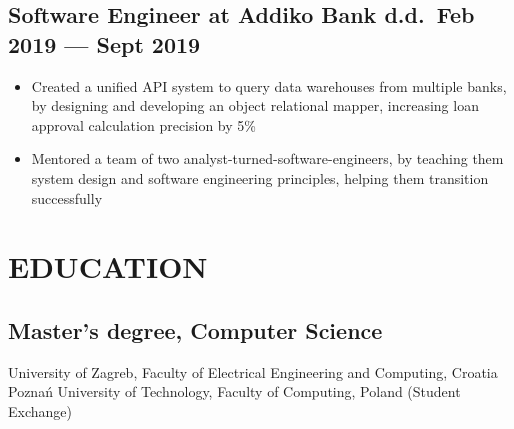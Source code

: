 \documentclass{article}
\begin{document}
\subsection{Software Engineer at Addiko Bank d.d.\ \hfill Feb 2019 --- Sept 2019}
\begin{itemize}
  \itemsep0em
  \item Created a unified API system to query data warehouses from multiple banks, by designing and developing an object relational mapper, increasing loan approval calculation precision by 5\%
  \item Mentored a team of two analyst-turned-software-engineers, by teaching them system design and software engineering principles, helping them transition successfully
\end{itemize}

\section{EDUCATION}
\subsection{Master's degree, Computer Science}
University of Zagreb, Faculty of Electrical Engineering and Computing, Croatia\\
Poznań University of Technology, Faculty of Computing, Poland (Student Exchange)



\end{document}
